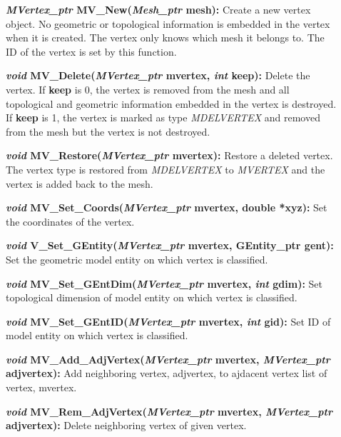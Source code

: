 \documentclass[12pt]{article}
\begin{document}
\begin{description}
\item[]\textbf{\textit{MVertex\_ptr} MV\_New(\textit{Mesh\_ptr}
    mesh):} Create a new vertex object. No geometric or topological
  information is embedded in the vertex when it is created. The vertex
  only knows which mesh it belongs to. The ID of the vertex is set by
  this function.
  
\item[]\textbf{\textit{void} MV\_Delete(\textit{MVertex\_ptr} mvertex,
    \textit{int} keep):} Delete the vertex. If \textbf{keep} is 0, the
  vertex is removed from the mesh and all topological and geometric
  information embedded in the vertex is destroyed. If \textbf{keep} is
  1, the vertex is marked as type \textit{MDELVERTEX} and removed from
  the mesh but the vertex is not destroyed.

\item[]\textbf{\textit{void} MV\_Restore(\textit{MVertex\_ptr}
    mvertex):} Restore a deleted vertex. The vertex type is restored
  from \textit{MDELVERTEX} to \textit{MVERTEX} and the vertex is
  added back to the mesh.

\item[]
  
\item[]\textbf{\textit{void} MV\_Set\_Coords(\textit{MVertex\_ptr}
    mvertex, double *xyz):} Set the coordinates of the vertex.
    
\item[]\textbf{\textit{void} V\_Set\_GEntity(\textit{MVertex\_ptr}
    mvertex, GEntity\_ptr gent):} Set the geometric model entity on
  which vertex is classified.


\item[]\textbf{\textit{void} MV\_Set\_GEntDim(\textit{MVertex\_ptr} mvertex,
\textit{int} gdim):} Set topological dimension of model entity on which
vertex is classified.

\item[]\textbf{\textit{void} MV\_Set\_GEntID(\textit{MVertex\_ptr} mvertex,
\textit{int} gid):} Set ID of model entity on which vertex is
classified.

\item[]\textbf{\textit{void} MV\_Add\_AdjVertex(\textit{MVertex\_ptr}
mvertex, \textit{MVertex\_ptr} adjvertex):} Add neighboring vertex,
adjvertex, to ajdacent vertex list of vertex, mvertex.

\item[]\textbf{\textit{void} MV\_Rem\_AdjVertex(\textit{MVertex\_ptr}
mvertex, \textit{MVertex\_ptr} adjvertex):} Delete neighboring vertex
of given vertex.


\end{description}
\end{document}
